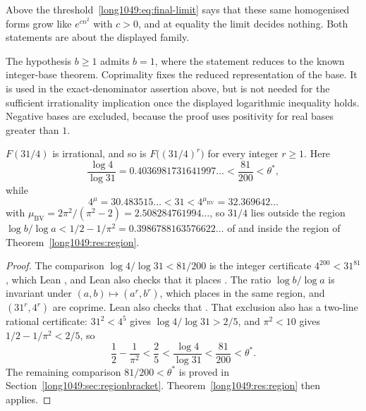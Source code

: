 \documentclass[11pt]{article}
\begin{document}
\noindent Above the threshold~\eqref{long1049:eq:final-limit} says that these same
homogenised forms grow like $e^{cn^{2}}$ with $c>0$, and at equality the limit
decides nothing.  Both statements are about the displayed family.

\noindent The hypothesis $b\ge1$ admits $b=1$, where the statement reduces to
the known integer-base theorem. Coprimality fixes the reduced
representation of the base. It is used in the exact-denominator
assertion above, but is not needed for the sufficient irrationality
implication once the displayed logarithmic inequality holds.
Negative bases are excluded,
because the proof uses positivity for real bases greater than $1$.

\begin{sloppypar}
\begin{theorem}\label{long1049:res:31over4}
$F(31/4)$ is irrational, and so is $F\bigl((31/4)^{r}\bigr)$ for every integer
$r\ge1$.  Here
\[
 \frac{\log4}{\log31}=0.4036981731641997\ldots<\frac{81}{200}<\theta^{*},
\]
while
\[
 4^{\mu}=30.483515\ldots<31<4^{\mu_{\mathrm{BV}}}=32.369642\ldots
\]
with
$\mu_{\mathrm{BV}}=2\pi^{2}/(\pi^{2}-2)=2.508284761994\ldots$, so $31/4$ lies
outside the region $\log b/\log a<1/2-1/\pi^{2}=0.3986788163576622\ldots$ of
\cite[Thm.~2, p.~177]{bv1994} and inside the region of
Theorem~\ref{long1049:res:region}.
\end{theorem}
\end{sloppypar}

\begin{proof}
The comparison $\log4/\log31<81/200$ is the integer certificate
$4^{200}<31^{81}$, which Lean
,
and Lean also checks that it places
.
The ratio $\log b/\log a$ is invariant under $(a,b)\mapsto(a^{r},b^{r})$,
which places
 in the same region, and $(31^{r},4^{r})$ are coprime.
Lean also checks that
.
That exclusion also has a two-line rational certificate: $31^{2}<4^{5}$ gives
$\log4/\log31>2/5$, and $\pi^{2}<10$ gives $1/2-1/\pi^{2}<2/5$, so
\[
 \frac12-\frac1{\pi^{2}}<\frac25<\frac{\log4}{\log31}<\frac{81}{200}<\theta^{*}.
\]
The remaining comparison $81/200<\theta^{*}$ is proved in
Section~\ref{long1049:sec:regionbracket}.  Theorem~\ref{long1049:res:region} then applies.
\end{proof}
\end{document}

